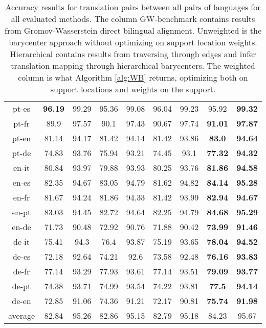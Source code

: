 \documentclass{article}
\begin{document}
\begin{table*}[t]
\begin{tabular}{c|cc|cc|cc|cc}
pt-es  &  \bf 96.19  &  99.29  &  95.36  &  99.08  &  96.04  &  99.23  &  95.92  &  \bf 99.32 \\
pt-fr  &  89.9  &  97.57  &  90.1  &  97.43  &  90.67  &  97.74  &  \bf 91.01  &  \bf 97.87 \\
pt-en  &  81.14  &  94.17  &  81.42  &  94.14  &  81.42  &  93.86  &  \bf 83.0  &  \bf 94.64 \\
pt-de  &  74.83  &  93.76  &  75.94  &  93.21  &  74.45  &  93.1  &  \bf 77.32  &  \bf 94.32 \\
en-it  &  80.84  &  93.97  &  79.88  &  93.93  &  80.25  &  93.76  &  \bf 81.86  &  \bf 94.58 \\
en-es  &  82.35  &  94.67  &  83.05  &  94.79  &  81.62  &  94.82  &  \bf 84.14  &  \bf 95.28 \\
en-fr  &  81.67  &  94.24  &  81.86  &  94.33  &  81.42  &  93.99  &  \bf 82.94  &  \bf 94.67 \\
en-pt  &  83.03  &  94.45  &  82.72  &  94.64  &  82.25  &  94.79  &  \bf 84.68  &  \bf 95.29 \\
en-de  &  71.73  &  90.48  &  72.92  &  90.76  &  71.88  &  90.42  &  \bf 73.99  &  \bf 91.46 \\
de-it  &  75.41  &  94.3  &  76.4  &  93.87  &  75.19  &  93.65  &  \bf 78.04  &  \bf 94.52 \\
de-es  &  72.18  &  92.64  &  74.21  &  92.6  &  73.58  &  92.48  &  \bf 76.16  &  \bf 93.83 \\
de-fr  &  77.14  &  93.29  &  77.93  &  93.61  &  77.14  &  93.51  &  \bf 79.09  &  \bf 93.77 \\
de-pt  &  74.38  &  93.71  &  74.99  &  93.54  &  74.22  &  93.81  &  \bf 77.5  &  \bf 94.14 \\
de-en  &  72.85  &  91.06  &  74.36  &  91.21  &  72.17  &  90.81  &  \bf 75.74  &  \bf 91.98 \\
average  &  82.84  &  95.26  &  82.86  &  95.15  &  82.79  &  95.18  &  84.23  &  95.67
  \\ \hline
\end{tabular}
\caption{Accuracy results for translation pairs between all pairs of languages for all evaluated methods. The column GW-benchmark contains results from Gromov-Wasserstein direct bilingual alignment. Unweighted is the barycenter approach without optimizing on support location weights. Hierarchical contains results from traversing through edges and infer translation mapping through hierarchical barycenters. The weighted column is what Algorithm \ref{alg:WB} returns, optimizing both on support locations and weights on the support.}
\label{table:total-res}
\end{table*}
\fi
\end{document}
